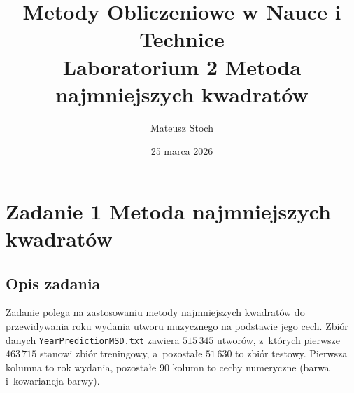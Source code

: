 \documentclass[12pt, a4paper]{article}
\title{
  \textbf{Metody Obliczeniowe w Nauce i Technice} \\[0.5em]
  \large Laboratorium 2 \textemdash{} Metoda najmniejszych kwadratów
}
\author{Mateusz Stoch}
\date{25 marca 2026}
\begin{document}
\maketitle

\section{Zadanie 1 \textemdash{} Metoda najmniejszych kwadratów}

\subsection{Opis zadania}

Zadanie polega na zastosowaniu metody najmniejszych kwadratów do przewidywania
roku wydania utworu muzycznego na podstawie jego cech. Zbiór danych
\texttt{YearPredictionMSD.txt} zawiera $515\,345$ utworów, z~których pierwsze
$463\,715$ stanowi zbiór treningowy, a~pozostałe $51\,630$ to zbiór testowy.
Pierwsza kolumna to rok wydania, pozostałe $90$ kolumn to cechy numeryczne
(barwa i~kowariancja barwy).
\end{document}
